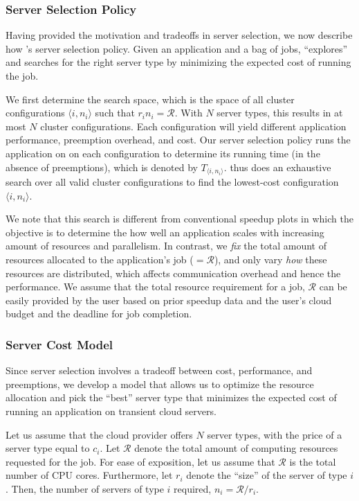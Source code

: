\subsubsection{Server Selection Policy}

Having provided the motivation and tradeoffs in server selection, we now describe how \sysname's server selection policy. 
Given an application and a bag of jobs, \sysname ``explores'' and searches for the right server type by minimizing the expected cost of running the job.

We first determine the search space, which is the space of all cluster configurations $\langle i,n_i \rangle$ such that $r_i n_i = \mathcal{R}$. With $N$ server types, this results in at most $N$ cluster configurations.
Each configuration will yield different application performance, preemption overhead, and cost.
Our server selection policy runs the application on on each configuration to determine its running time (in the absence of preemptions), which is denoted by $T_{\langle i,n_i \rangle}$. 
\sysname thus does an exhaustive search over all valid cluster configurations to find the lowest-cost configuration $\langle i, n_i \rangle$. 

We note that this search is different from conventional speedup plots in which the objective is to determine the how well an application scales with increasing amount of resources and parallelism. 
In contrast, we \emph{fix} the total amount of resources allocated to the application's job ($=\mathcal{R}$), and only vary \emph{how} these resources are distributed, which affects communication overhead and hence the performance.
We assume that the total resource requirement for a job, $\mathcal{R}$ can be easily provided by the user based on prior speedup data and the user's cloud budget and the deadline for job completion. 



\subsubsection{Server Cost Model}

Since server selection involves a tradeoff between cost, performance, and preemptions, we develop a model that allows us to optimize the resource allocation and pick the ``best'' server type that minimizes the expected cost of running an application on transient cloud servers. 


Let us assume that the cloud provider offers $N$ server types, with the price of a server type equal to $c_i$. 
Let $\mathcal{R}$ denote the total amount of computing resources requested for the job. For ease of exposition, let us assume that $\mathcal{R}$ is the total number of CPU cores.
Furthermore, let $r_i$ denote the ``size'' of the server of type $i$.
Then, the number of servers of type $i$ required, $n_i = \mathcal{R}/r_i$. 

